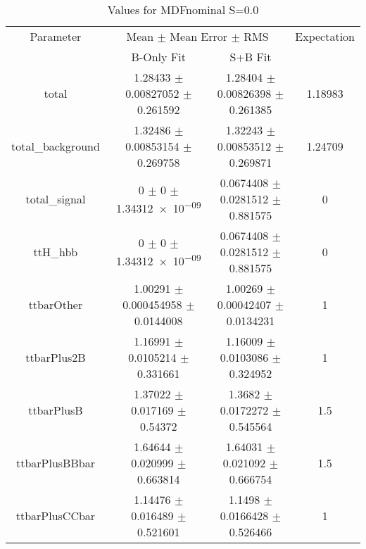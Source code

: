 \begin{table}
\centering
\caption{Values for MDFnominal S=0.0}
\begin{tabular}{cccc}
\toprule
Parameter & \multicolumn{2}{c}{Mean $\pm$ Mean Error $\pm$ RMS} & Expectation\\
 & B-Only Fit & S+B Fit & \\
\midrule
total & \num{1.28433} $\pm$ \num{0.00827052} $\pm$ \num{0.261592} & \num{1.28404} $\pm$ \num{0.00826398} $\pm$ \num{0.261385} & \num{1.18983}\\
total\_background & \num{1.32486} $\pm$ \num{0.00853154} $\pm$ \num{0.269758} & \num{1.32243} $\pm$ \num{0.00853512} $\pm$ \num{0.269871} & \num{1.24709}\\
total\_signal & \num{0} $\pm$ \num{0} $\pm$ \num{1.34312e-09} & \num{0.0674408} $\pm$ \num{0.0281512} $\pm$ \num{0.881575} & \num{0}\\
ttH\_hbb & \num{0} $\pm$ \num{0} $\pm$ \num{1.34312e-09} & \num{0.0674408} $\pm$ \num{0.0281512} $\pm$ \num{0.881575} & \num{0}\\
ttbarOther & \num{1.00291} $\pm$ \num{0.000454958} $\pm$ \num{0.0144008} & \num{1.00269} $\pm$ \num{0.00042407} $\pm$ \num{0.0134231} & \num{1}\\
ttbarPlus2B & \num{1.16991} $\pm$ \num{0.0105214} $\pm$ \num{0.331661} & \num{1.16009} $\pm$ \num{0.0103086} $\pm$ \num{0.324952} & \num{1}\\
ttbarPlusB & \num{1.37022} $\pm$ \num{0.017169} $\pm$ \num{0.54372} & \num{1.3682} $\pm$ \num{0.0172272} $\pm$ \num{0.545564} & \num{1.5}\\
ttbarPlusBBbar & \num{1.64644} $\pm$ \num{0.020999} $\pm$ \num{0.663814} & \num{1.64031} $\pm$ \num{0.021092} $\pm$ \num{0.666754} & \num{1.5}\\
ttbarPlusCCbar & \num{1.14476} $\pm$ \num{0.016489} $\pm$ \num{0.521601} & \num{1.1498} $\pm$ \num{0.0166428} $\pm$ \num{0.526466} & \num{1}\\
\bottomrule
\end{tabular}
\end{table}